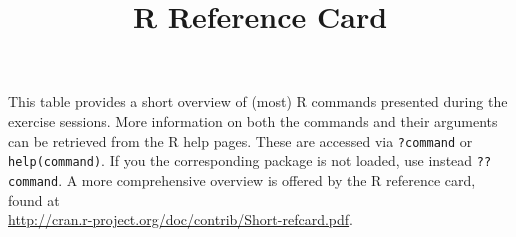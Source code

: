\documentclass[a4paper,9pt]{scrartcl}
\title{R Reference Card}
\author{\normalsize}
\date{\normalsize}
\begin{document}
\pagestyle{empty}
\maketitle
\vspace*{-1cm}

This table provides a short overview of (most) R commands presented during the exercise sessions. More information on both the commands and their arguments can be retrieved from the R help pages. These are accessed via \lstinline|?command| or \lstinline|help(command)|. If you the corresponding package is not loaded, use instead \lstinline|??command|. A more comprehensive overview is offered by the R reference card, found at\\
\url{http://cran.r-project.org/doc/contrib/Short-refcard.pdf}.

\newcommand{\columnaslst}[1]{\lstinline{#1}}
\end{document}
